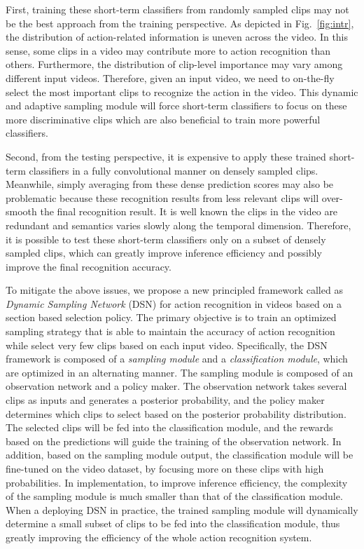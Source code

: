 \documentclass[journal]{IEEEtran}
\begin{document}
First, training these short-term classifiers from randomly sampled clips may not be the best approach from the training perspective.
As depicted in Fig.~\ref{fig:intr}, the distribution of action-related information is uneven across the video.
In this sense, some clips in a video may contribute more to action recognition than others.
Furthermore, the distribution of clip-level importance may vary among different input videos.
Therefore, given an input video, we need to on-the-fly select the most important clips to recognize the action in the video.
This dynamic and adaptive sampling module will force short-term classifiers to focus on these more discriminative clips which are also beneficial to train more powerful classifiers.

Second, from the testing perspective, it is expensive to apply these trained short-term classifiers in a fully convolutional manner on densely sampled clips.
Meanwhile, simply averaging from these dense prediction scores may also be problematic because these recognition results from less relevant clips will over-smooth the final recognition result.
It is well known the clips in the video are redundant and semantics varies slowly along the temporal dimension.
Therefore, it is possible to test these short-term classifiers only on a subset of densely sampled clips, which can greatly improve inference efficiency and possibly improve the final recognition accuracy.

To mitigate the above issues, we propose a new principled framework called as {\em Dynamic Sampling Network} (DSN) for action recognition in videos based on a section based selection policy.
The primary objective is to train an optimized sampling strategy that is able to maintain the accuracy of action recognition while select very few clips based on each input video.
Specifically, the DSN framework is composed of a {\em sampling module} and a {\em classification module}, which are optimized in an alternating manner.
The sampling module is composed of an observation network and a policy maker.
The observation network takes several clips as inputs and generates a posterior probability, and the policy maker determines which clips to select based on the posterior probability distribution.
The selected clips will be fed into the classification module, and the rewards based on the predictions will guide the training of the observation network.
In addition, based on the sampling module output, the classification module will be fine-tuned on the video dataset, by focusing more on these clips with high probabilities.
In implementation, to improve inference efficiency, the complexity of the sampling module is much smaller than that of the classification module.
When a deploying DSN in practice, the trained sampling module will dynamically determine a small subset of clips to be fed into the classification module, thus greatly improving the efficiency of the whole action recognition system.
\end{document}
